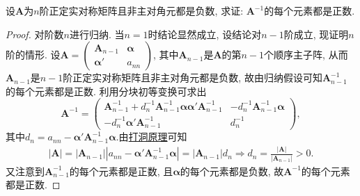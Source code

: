 \documentclass[../../main.tex]{subfiles}%
\begin{document}
\begin{example}
设$\boldsymbol{A}$为$n$阶正定实对称矩阵且非主对角元都是负数, 求证: $\boldsymbol{A}^{-1}$的每个元素都是正数.
\end{example}
\begin{proof}

对阶数$n$进行归纳. 当$n = 1$时结论显然成立, 设结论对$n - 1$阶成立, 现证明$n$阶的情形. 设$\boldsymbol{A}=\begin{pmatrix}
\boldsymbol{A}_{n - 1} & \boldsymbol{\alpha} \\
\boldsymbol{\alpha}' & a_{nn}
\end{pmatrix}$, 其中$\boldsymbol{A}_{n - 1}$是$\boldsymbol{A}$的第$n - 1$个顺序主子阵, 从而$\boldsymbol{A}_{n - 1}$是$n - 1$阶正定实对称矩阵且非主对角元都是负数, 故由归纳假设可知$\boldsymbol{A}_{n - 1}^{-1}$的每个元素都是正数. 利用分块初等变换可求出
\[
\boldsymbol{A}^{-1}=\begin{pmatrix}
\boldsymbol{A}_{n - 1}^{-1}+d_n^{-1}\boldsymbol{A}_{n - 1}^{-1}\boldsymbol{\alpha}\boldsymbol{\alpha}'\boldsymbol{A}_{n - 1}^{-1} & -d_n^{-1}\boldsymbol{A}_{n - 1}^{-1}\boldsymbol{\alpha} \\
-d_n^{-1}\boldsymbol{\alpha}'\boldsymbol{A}_{n - 1}^{-1} & d_n^{-1}
\end{pmatrix},
\]
其中$d_n = a_{nn}-\boldsymbol{\alpha}'\boldsymbol{A}_{n - 1}^{-1}\boldsymbol{\alpha}$.由\hyperref[proposition:打洞原理]{打洞原理}可知
\begin{align*}
|\boldsymbol{A}|=\left| \boldsymbol{A}_{n-1} \right|\left| a_{nn}-\boldsymbol{\alpha }' \boldsymbol{A}_{n-1}^{-1}\boldsymbol{\alpha } \right|=\left| \boldsymbol{A}_{n-1} \right|d_n\Rightarrow d_n=\frac{|\boldsymbol{A}|}{|\boldsymbol{A}_{n-1}|}>0.
\end{align*}
又注意到$\boldsymbol{A}_{n - 1}^{-1}$的每个元素都是正数, 且$\boldsymbol{\alpha}$的每个元素都是负数, 故$\boldsymbol{A}^{-1}$的每个元素都是正数. 

\end{proof}
\end{document}
